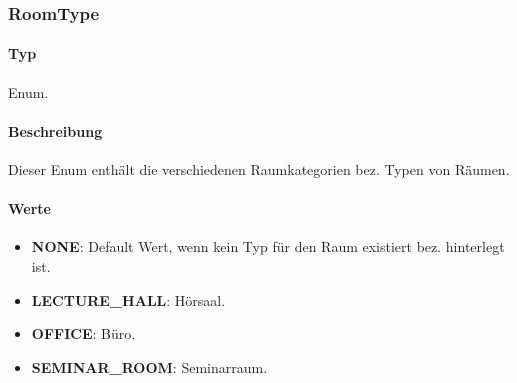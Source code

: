 \subsubsection{RoomType}
\paragraph*{Typ}
Enum.
\paragraph*{Beschreibung}
Dieser Enum enthält die verschiedenen Raumkategorien bez. Typen von Räumen.

\paragraph*{Werte}
\begin{itemize}
    \item \textbf{NONE}: Default Wert, wenn kein Typ für den Raum existiert bez. hinterlegt ist.
    \item \textbf{LECTURE\_HALL}: Hörsaal.
    \item \textbf{OFFICE}: Büro.
    \item \textbf{SEMINAR\_ROOM}: Seminarraum.
\end{itemize}
